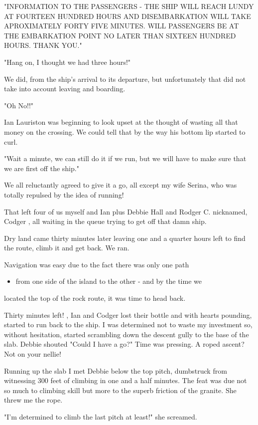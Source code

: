 \documentclass[a5paper,openany,font 10pt]{scrbook}
\begin{document}
"INFORMATION TO THE PASSENGERS - THE SHIP WILL REACH LUNDY
AT FOURTEEN HUNDRED HOURS AND DISEMBARKATION WILL TAKE
APROXIMATELY FORTY FIVE MINUTES. WILL PASSENGERS BE AT THE
EMBARKATION POINT NO LATER THAN SIXTEEN HUNDRED HOURS. THANK
YOU."

"Hang on, I thought we had three hours!"

We did, from the ship's arrival to its departure, but
unfortunately  that did not take into account leaving and
boarding.

"Oh No!!"

Ian Lauriston was beginning to look upset at the thought of
wasting all that money on the crossing. We could tell that by the
way his bottom lip started to curl.

"Wait a minute, we can still do it if we run, but we will
have to make sure that we are first off the ship."

We all reluctantly agreed to give it a go, all except my
wife Serina, who was totally repulsed by the idea of running!

That left four of us  myself and Ian plus Debbie Hall and
Rodger C.  nicknamed, Codger , all waiting in the queue trying to
get off that damn ship.

Dry land came thirty minutes later leaving one and a quarter
hours left to find the route, climb it and get back. We ran.

Navigation was easy due to the fact there was only one path
\begin{itemize}
\item from one side of the island to the other - and by the time we
\end{itemize}
located the top of the rock route, it was time to head back.

Thirty minutes left!  ,
Ian and Codger lost their bottle and with hearts pounding,
started to run back to the ship.  I was determined not to waste
my investment so, without hesitation, started scrambling down the
descent gully to the base of the slab.  Debbie shouted "Could I
have a go?" Time was pressing. A roped ascent?  Not on your
nellie!

Running up the slab I met Debbie below the top pitch,
dumbstruck from witnessing  300 feet of climbing in one and a
half minutes.  The feat was due not so much to climbing skill but
more to the superb friction of the granite.  She threw me the
rope.

"I'm determined to climb the last pitch at least!" she
screamed.
\end{document}
